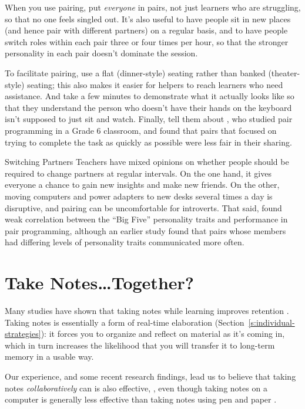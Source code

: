 When you use pairing, put \emph{everyone} in pairs, not just learners who are
struggling, so that no one feels singled out. It's also useful to have
people sit in new places (and hence pair with different partners) on a
regular basis, and to have people switch roles within each pair three or
four times per hour, so that the stronger personality in each pair
doesn't dominate the session.

To facilitate pairing, use a flat (dinner-style) seating rather than
banked (theater-style) seating; this also makes it easier for helpers to
reach learners who need assistance. And take a few minutes to
demonstrate what it actually looks like so that they understand the
person who doesn't have their hands on the keyboard isn't supposed to
just sit and watch. Finally, tell them about \cite{Lewi2015}, who
studied pair programming in a Grade 6 classroom, and found that pairs
that focused on trying to complete the task as quickly as possible were
less fair in their sharing.

\begin{aside}{Switching Partners}
  Teachers have mixed opinions on whether people should be required to
  change partners at regular intervals. On the one hand, it gives
  everyone a chance to gain new insights and make new friends. On the
  other, moving computers and power adapters to new desks several times
  a day is disruptive, and pairing can be uncomfortable for introverts.
  That said, \cite{Hann2010} found weak correlation between the ``Big
  Five'' personality traits and performance in pair programming, although
  an earlier study \cite{Wall2009} found that pairs whose members had
  differing levels of personality traits communicated more often.
\end{aside}

\section{Take Notes{\ldots}Together?}\label{s:classroom-notetaking}

Many studies have shown that taking notes while learning improves
retention \cite{Aike1975,Boha2011}. Taking notes is essentially a
form of real-time elaboration (Section~\ref{s:individual-strategies}): it
forces you to organize and reflect on material as it's coming in, which
in turn increases the likelihood that you will transfer it to long-term
memory in a usable way.

Our experience, and some recent research findings, lead us to believe
that taking notes \emph{collaboratively} can is also effective,
\cite{Ornd2015,Yang2015}, even though taking notes on a
computer is generally less effective than taking notes using pen and
paper \cite{Muel2014}.

